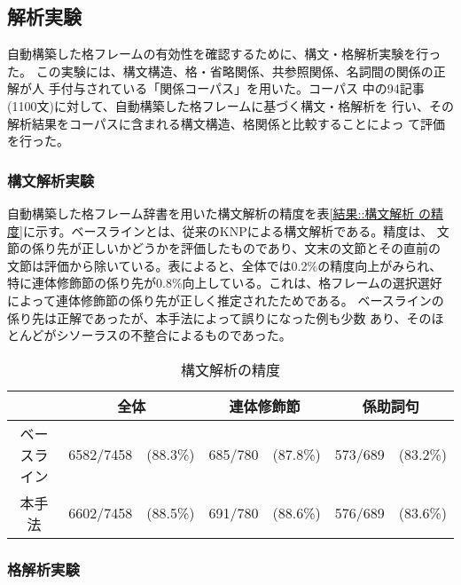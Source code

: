 \documentclass[fleqn]{nlp}
\begin{document}
\subsection{解析実験}

自動構築した格フレームの有効性を確認するために、構文・格解析実験を行った。
この実験には、構文構造、格・省略関係、共参照関係、名詞間の関係の正解が人
手付与されている「関係コーパス」\cite{Kawahara2002ec}を用いた。コーパス
中の94記事(1100文)に対して、自動構築した格フレームに基づく構文・格解析を
行い、その解析結果をコーパスに含まれる構文構造、格関係と比較することによっ
て評価を行った。


\subsubsection{構文解析実験}

自動構築した格フレーム辞書を用いた構文解析の精度を表\ref{結果::構文解析
の精度}に示す。ベースラインとは、従来のKNPによる構文解析である。精度は、
文節の係り先が正しいかどうかを評価したものであり、文末の文節とその直前の
文節は評価から除いている。表によると、全体では0.2\%の精度向上がみられ、
特に連体修飾節の係り先が0.8\%向上している。これは、格フレームの選択選好
によって連体修飾節の係り先が正しく推定されたためである。
ベースラインの係り先は正解であったが、本手法によって誤りになった例も少数
あり、そのほとんどがシソーラスの不整合によるものであった。

\begin{table}[t]
 \begin{center}
  \caption{構文解析の精度}

  \vspace*{1ex}

  \label{結果::構文解析の精度}
  \begin{tabular}{c|c@{ }r|c@{ }r|c@{ }r} \hline
   & \multicolumn{2}{c|}{全体} & \multicolumn{2}{c|}{連体修飾節} & \multicolumn{2}{c}{係助詞句} \\ \hline
   ベースライン & 6582/7458 & (88.3\%) & 685/780 & (87.8\%) & 573/689 & (83.2\%) \\
   本手法 & 6602/7458 & (88.5\%) & 691/780 & (88.6\%) & 576/689 & (83.6\%) \\ \hline
  \end{tabular}
 \end{center}
\end{table}


\subsubsection{格解析実験}
\end{document}
